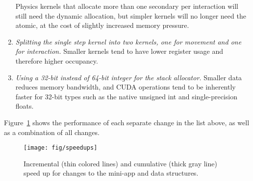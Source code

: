\documentclass{webofc}
\begin{document}
\begin{enumerate}[left=0pt, itemsep=0pt]
    Physics kernels that allocate more than one secondary per interaction will
    still need the dynamic allocation, but simpler kernels will no longer need
    the atomic, at the cost of slightly increased memory pressure.
  \item \emph{Splitting the single step kernel into two kernels, one for movement
    and one for interaction.} Smaller kernels tend to have lower register usage
    and therefore higher occupancy.
  \item \emph{Using a 32-bit instead of 64-bit integer for the stack allocator.}
    Smaller data reduces memory bandwidth, and CUDA operations tend to be
    inherently faster for 32-bit types such as the native unsigned int and
    single-precision floats.
\end{enumerate}
Figure~\ref{fig:speedup} shows the performance of each separate change in the
list above, as well as a combination of all changes.
%
\begin{figure}[htb]%
  \centering%
  \texttt{[image: fig/speedups]}%
  \caption{Incremental (thin colored lines) and cumulative (thick gray line)
  speed up for changes to the mini-app and data structures.}%
  \label{fig:speedup}%
\end{figure}
\end{document}
